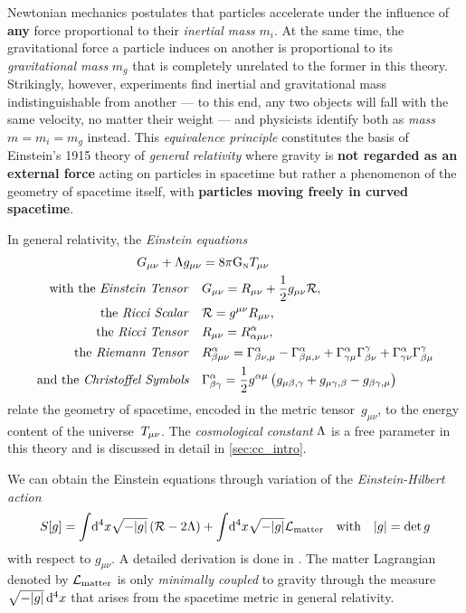 \documentclass[12pt,parskip=half]{scrreprt}
\begin{document}
Newtonian mechanics postulates that particles accelerate under the influence of \textbf{any} force proportional to their \emph{inertial mass} \(m_i\). At the same time, the gravitational force a particle induces on another is proportional to its \emph{gravitational mass} \(m_g\) that is completely unrelated to the former in this theory. Strikingly, however, experiments find inertial and gravitational mass indistinguishable from another  --- to this end, any two objects will fall with the same velocity, no matter their weight --- and physicists identify both as \emph{mass} \(m=m_i=m_g\) instead. This \emph{equivalence principle} constitutes the basis of Einstein's 1915 theory of \emph{general relativity} where gravity is \textbf{not regarded as an external force} acting on particles in spacetime but rather a phenomenon of the geometry of spacetime itself, with \textbf{particles moving freely in curved spacetime}.

In general relativity, the \emph{Einstein equations}
\begin{align}\label{eq:einstein_eqns}
	\Gtens_{\mu \nu} + \cosmconst g_{\mu\nu} &= 8 \pi \Newtconst \Ttens_{\mu \nu} \\
	\text{with the \emph{Einstein Tensor}} \quad &\Gtens_{\mu \nu} = \Rtens_{\mu \nu} + \frac{1}{2}g_{\mu \nu}\Rscal \eqpunct{,} \label{eq:einstein_tensor} \\
	\text{the \emph{Ricci Scalar}} \quad &\Rscal = g^{\mu \nu}\Rtens_{\mu \nu} \eqpunct{,} \\
	\text{the \emph{Ricci Tensor}} \quad &\Rtens_{\mu \nu} = \Riemtens^\alpha_{\alpha \mu \nu} \eqpunct{,} \\
	\text{the \emph{Riemann Tensor}} \quad &\Riemtens^\alpha_{\beta \mu \nu} = \Gamma^\alpha_{\beta \nu, \mu} - \Gamma^\alpha_{\beta \mu, \nu} + \Gamma^\alpha_{\gamma \mu}\Gamma^\gamma_{\beta \nu} + \Gamma^\alpha_{\gamma \nu}\Gamma^\gamma_{\beta \mu} \\
	\text{and the \emph{Christoffel Symbols}} \quad &\Gamma^\alpha_{\beta \gamma} = \frac{1}{2} g^{\alpha \mu} \del{g_{\mu \beta, \gamma} + g_{\mu \gamma, \beta} - g_{\beta \gamma, \mu}}
\end{align}
relate the geometry of spacetime, encoded in the metric tensor~\(g_{\mu \nu}\), to the energy content of the universe~\(T_{\mu \nu}\). The \emph{cosmological constant} \(\Lambda\) is a free parameter in this theory and is discussed in detail in \autoref{sec:cc_intro}.

We can obtain the Einstein equations through variation of the \emph{Einstein-Hilbert action}
\begin{align}\label{eq:einstein_hilbert_action}
	S[g] = \int \! \dif{^4x} \sqrt{-\metrdet{g}} \del{\Rscal - 2\cosmconst} + \int \! \dif{^4x} \sqrt{-\metrdet{g}} \lagrdensmatter \quad \text{with} \quad \metrdet{g} = \det{g}
\end{align}
with respect to \(g_{\mu \nu}\). A detailed derivation is done in . The matter Lagrangian denoted by \(\mathcal{L}_\textnormal{matter}\) is only \emph{minimally coupled} to gravity through the measure \(\sqrt{-\metrdet{g}}\dif{^4x}\) that arises from the spacetime metric in general relativity.
\end{document}

